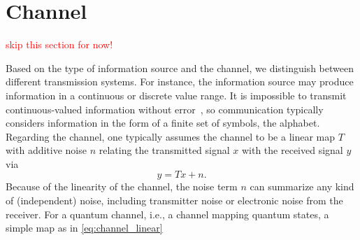 \section{Channel}

\textcolor{red}{skip this section for now!}

Based on the type of information source and the channel, we distinguish between different transmission systems.
For instance, the information source may produce information in a continuous or discrete value range.
It is impossible to transmit continuous-valued information without error~\cite[p.~47]{Shannon1948}, so communication typically considers information in the form of a finite set of symbols, the alphabet.
Regarding the channel, one typically assumes the channel to be a linear map $T$ with additive noise $n$ relating the transmitted signal $x$ with the received signal $y$ via
\begin{equation}
	y
	=
	Tx
	+
	n
	\label{eq:classic_channel}
	.
\end{equation}
Because of the linearity of the channel, the noise term $n$ can summarize any kind of (independent) noise, including transmitter noise or electronic noise from the receiver.
For a quantum channel, i.e., a channel mapping quantum states, a simple map as in \cref{eq:channel_linear}

